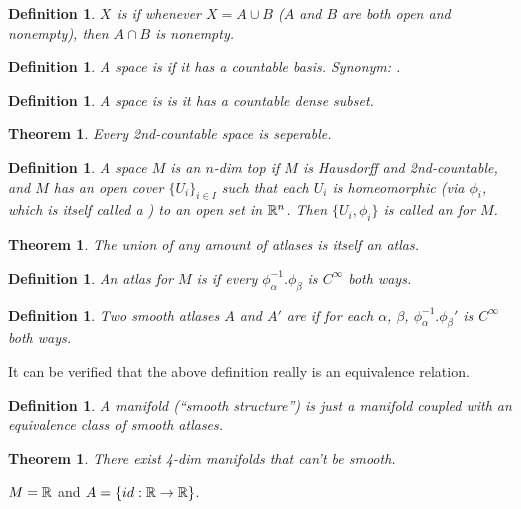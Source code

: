 \documentclass[11pt]{amsbook}
\theoremstyle{mystyle} \newtheorem{thrm}[thm]{Theorem}
\theoremstyle{mystyle} \newtheorem{defi}[thm]{Definition}
\theoremstyle{mystyle} \newtheorem{coro}[thm]{Corollary}
\theoremstyle{mystyle} \newtheorem{propo}[thm]{Proposition}
\theoremstyle{mystyle} \newtheorem{lemm}[thm]{Lemma}
\numberwithin{thm}{section}
\begin{document}
\begin{defi}
	$X$ is  if whenever $X = A \cup B$ ($A$ and $B$ are both open and nonempty), then $A \cap B$ is nonempty.
\end{defi}

\begin{defi}
	A space is  if it has a countable basis.  Synonym: .
\end{defi}
\begin{defi}
	A space is  is it has a countable dense subset.
\end{defi}
\begin{thrm}
	Every 2nd-countable space is seperable.
\end{thrm}
\begin{defi}
	A space $M$ is an $n$-dim top  if $M$ is Hausdorff and 2nd-countable, and $M$ has an open cover $\{U_i\}_{i \in I}$ such that each $U_i$ is homeomorphic (via $\phi_i$, which is itself called a ) to an open set in ${\mathbb R}^n$.  Then $\{ U_i, \phi_i \}$ is called an  for $M$.
\end{defi}
\begin{thrm}
	The union of any amount of atlases is itself an atlas.
\end{thrm}

\begin{defi}
	An atlas for $M$ is  if every $\phi_\alpha^{-1}.\phi_\beta$ is $C^\infty$ both ways.
\end{defi}

\begin{defi}
	Two smooth atlases $A$ and $A'$ are  if for each $\alpha$, $\beta$, $\phi_\alpha^{-1}.\phi_\beta'$ is $C^\infty$ both ways.
\end{defi}
\begin{rmk}
	It can be verified that the above definition really is an equivalence relation.
\end{rmk}

\begin{defi}
	A  manifold (``smooth structure'') is just a manifold coupled with an equivalence class of smooth atlases.
\end{defi}

\begin{thrm}
	There exist 4-dim manifolds that can't be smooth.
\end{thrm}



\begin{example}
	$M = {\mathbb R}$ and $A = \{ id: {\mathbb R} \to {\mathbb R} \}$.
\end{example}
\end{document}
